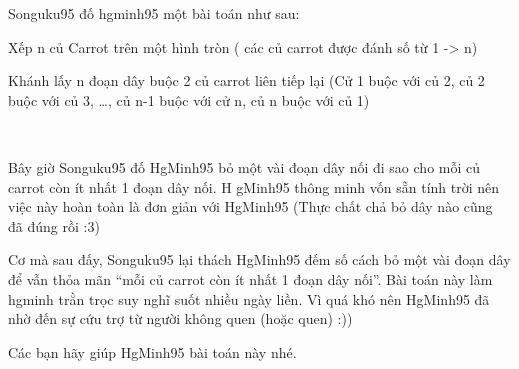 Songuku95 đố hgminh95 một bài toán như sau:

Xếp n củ Carrot trên một hình tròn ( các củ carrot được đánh số từ 1 -> n)

Khánh lấy n đoạn dây buộc 2 củ carrot liên tiếp lại (Cử 1 buộc với củ 2, củ 2 buộc với củ 3, …, củ n-1 buộc với cử n, củ n buộc với củ 1)

 

Bây giờ Songuku95 đố HgMinh95 bỏ một vài đoạn dây nối đi sao cho mỗi củ carrot còn ít nhất 1 đoạn dây nối. H gMinh95 thông minh vốn sẵn tính trời nên việc này hoàn toàn là đơn giản với HgMinh95 (Thực chất chả bỏ dây nào cũng đã đúng rồi :3)

Cơ mà sau đấy, Songuku95 lại thách HgMinh95 đếm số cách bỏ một vài đoạn dây để vẫn thỏa mãn “mỗi củ carrot còn ít nhất 1 đoạn dây nối”. Bài toán này làm hgminh trằn trọc suy nghĩ suốt nhiều ngày liền. Vì quá khó nên HgMinh95 đã nhờ đến sự cứu trợ từ người không quen (hoặc quen) :))

Các bạn hãy giúp HgMinh95 bài toán này nhé.